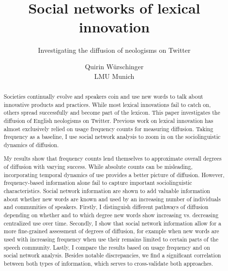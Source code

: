 \documentclass[
  a4paper,
  abstract=on,
  captions=tableabove
  ]{scrartcl}
\begin{document}


  \title{Social networks of lexical innovation}
  \subtitle{Investigating the diffusion of neologisms on Twitter}
  \author{Quirin Würschinger\\ LMU Munich}
  \maketitle



  \cleardoublepage

  \begin{abstract}

    Societies continually evolve and speakers coin and use new words to talk about innovative products and practices. While most lexical innovations fail to catch on, others spread successfully and become part of the lexicon. This paper investigates the diffusion of English neologisms on Twitter. Previous work on lexical innovation has almost exclusively relied on usage frequency counts for measuring diffusion. Taking frequency as a baseline, I use social network analysis to zoom in on the sociolinguistic dynamics of diffusion.

    My results show that frequency counts lend themselves to approximate overall degrees of diffusion with varying success. While absolute counts can be misleading, incorporating temporal dynamics of use provides a better picture of diffusion. However, frequency-based information alone fail to capture important sociolinguistic characteristics. Social network information are shown to add valuable information about whether new words are known and used by an increasing number of individuals and communities of speakers. Firstly, I distinguish different pathways of diffusion depending on whether and to which degree new words show increasing vs. decreasing centralized use over time. Secondly, I show that social network information allow for a more fine-grained assessment of degrees of diffusion, for example when new words are used with increasing frequency when use their remains limited to certain parts of the speech community. Lastly, I compare the results based on usage frequency and on social network analysis. Besides notable discrepancies, we find a significant correlation between both types of information, which serves to cross-validate both approaches.


\end{abstract}
\end{document}
